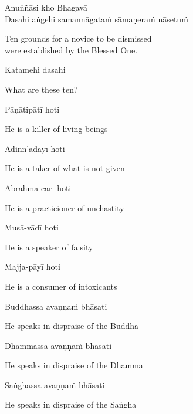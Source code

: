 Anuññāsi kho Bhagavā\\
Dasahi aṅgehi samannāgataṁ sāmaṇeraṁ nāsetuṁ

\begin{cprenglish}
  Ten grounds for a novice to be dismissed\\
  were established by the Blessed One.
\end{cprenglish}

Katamehi dasahi

\begin{cprenglish}
  What are these ten?
\end{cprenglish}

Pāṇātipātī hoti

\begin{cprenglish}
  He is a killer of living beings
\end{cprenglish}

Adinn'ādāyī hoti

\begin{cprenglish}
  He is a taker of what is not given
\end{cprenglish}

Abrahma-cārī hoti

\begin{cprenglish}
  He is a practicioner of unchastity
\end{cprenglish}

Musā-vādī hoti

\begin{cprenglish}
  He is a speaker of falsity
\end{cprenglish}

Majja-pāyī hoti

\begin{cprenglish}
  He is a consumer of intoxicants
\end{cprenglish}

Buddhassa avaṇṇaṁ bhāsati

\begin{cprenglish}
  He speaks in dispraise of the Buddha
\end{cprenglish}

Dhammassa avaṇṇaṁ bhāsati

\begin{cprenglish}
  He speaks in dispraise of the Dhamma
\end{cprenglish}

Saṅghassa avaṇṇaṁ bhāsati

\begin{cprenglish}
  He speaks in dispraise of the Saṅgha
\end{cprenglish}

